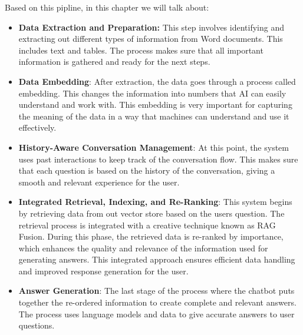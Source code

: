 Based on this pipline, in this chapter we will talk about:
\vskip 0.5cm
\begin{itemize}
\item \textbf{Data Extraction and Preparation:} This step involves identifying and extracting out different types of information from Word documents. This includes text and tables. The process makes sure that all important information is gathered and ready for the next steps.%
\vskip 0.5cm
\item \textbf{Data Embedding}: After extraction, the data goes through a process called embedding. This changes the information into numbers that AI can easily understand and work with. This embedding is very important for capturing the meaning of the data in a way that machines can understand and use it effectively. %
\vskip 0.5cm
\item \textbf{History-Aware Conversation Management}: At this point, the system uses past interactions to keep track of the conversation flow. This makes sure that each question is based on the history of the conversation, giving a smooth and relevant experience for the user.%
\vskip 0.5cm
\item \textbf{Integrated Retrieval, Indexing, and Re-Ranking}: This system begins by retrieving data from out vector store based on the users question. The retrieval process is integrated with a creative technique known as RAG Fusion. During this phase, the retrieved data is re-ranked by importance, which enhances the quality and relevance of the information used for generating answers. This integrated approach ensures efficient data handling and improved response generation for the user.
\vskip 0.5cm
\item \textbf{Answer Generation}: The last stage of the process where the chatbot puts together the re-ordered information to create complete and relevant answers. The process uses language models and data to give accurate answers to user questions.%
\end{itemize}

